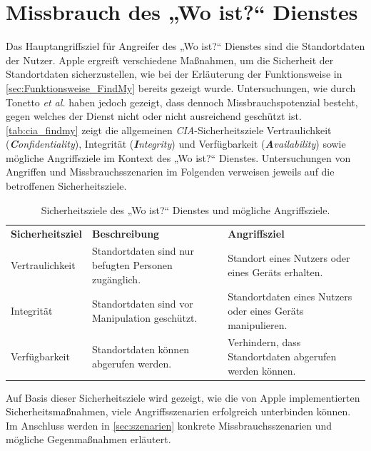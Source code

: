 \section{Missbrauch des „Wo ist?“ Dienstes}
\label{sec:Missbrauch}

Das Hauptangriffsziel für Angreifer des „Wo ist?“ Dienstes sind die Standortdaten der Nutzer.
Apple ergreift verschiedene Maßnahmen, um die Sicherheit der Standortdaten sicherzustellen, wie bei der Erläuterung der Funktionsweise in \autoref{sec:Funktionsweise_FindMy} bereits gezeigt wurde.
Untersuchungen, wie durch Tonetto \textit{et al.} \cite{Tonetto_FindMy} haben jedoch gezeigt, dass dennoch Missbrauchspotenzial besteht, gegen welches der Dienst nicht oder nicht ausreichend geschützt ist.
\autoref{tab:cia_findmy} zeigt die allgemeinen \textit{CIA}-Sicherheitsziele Vertraulichkeit (\textit{\textbf{C}onfidentiality}), Integrität (\textit{\textbf{I}ntegrity}) und Verfügbarkeit (\textit{\textbf{A}vailability}) sowie mögliche Angriffsziele im Kontext des „Wo ist?“ Dienstes.
Untersuchungen von Angriffen und Missbrauchsszenarien im Folgenden verweisen jeweils auf die betroffenen Sicherheitsziele.

\begin{table}[ht]
  \caption{Sicherheitsziele des „Wo ist?“ Dienstes und mögliche Angriffsziele.}
  \label{tab:cia_findmy}
  \begin{tabularx}{\textwidth}{ |l|X|X| }
    \hline
    \textbf{Sicherheitsziel}  & \textbf{Beschreibung}                                               & \textbf{Angriffsziel}                                           \\
    \Xhline{0.5mm}
    \hline
    Vertraulichkeit           & Standortdaten sind nur befugten Personen zugänglich.                & Standort eines Nutzers oder eines Geräts erhalten.              \\
    \hline
    Integrität                & Standortdaten sind vor Manipulation geschützt.                      & Standortdaten eines Nutzers oder eines Geräts manipulieren.     \\
    \hline
    Verfügbarkeit             & Standortdaten können abgerufen werden.                              & Verhindern, dass Standortdaten abgerufen werden können.         \\
    \hline
  \end{tabularx}
\end{table}
Auf Basis dieser Sicherheitsziele wird gezeigt, wie die von Apple implementierten Sicherheitsmaßnahmen, viele Angriffsszenarien erfolgreich unterbinden können.
Im Anschluss werden in \autoref{sec:szenarien} konkrete Missbrauchsszenarien und mögliche Gegenmaßnahmen erläutert.

